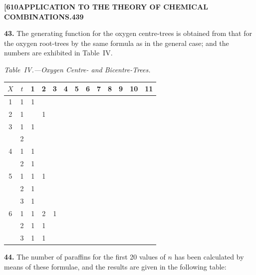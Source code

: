 \documentclass[11pt,a4paper]{article}
\begin{document}
{\newpage
\noindent\textbf{[610}\hspace{\fill}\textbf{APPLICATION TO THE THEORY OF CHEMICAL COMBINATIONS.}\hspace{\fill}\textbf{439}

\noindent\textbf{43.}
The generating function for the oxygen centre-trees is obtained from that for the oxygen root-trees by the same formula as in the general case; and the numbers are exhibited in Table~IV.

\medskip
\noindent\textit{Table~IV.---Oxygen Centre- and Bicentre-Trees.}
\begin{center}
\small
\begin{longtable}{|c|c|c|c|c|c|c|c|c|c|c|c|c|}
\hline
$X$ & $t$ & 1 & 2 & 3 & 4 & 5 & 6 & 7 & 8 & 9 & 10 & 11 \\
\hline
\endfirsthead
1 & 1 & 1 & & & & & & & & & & \\
\hline
2 & 1 & & 1 & & & & & & & & & \\
\hline
3 & 1 & 1 & & & & & & & & & & \\
  & 2 & & & & & & & & & & & \\
\hline
4 & 1 & 1 & & & & & & & & & & \\
  & 2 & 1 & & & & & & & & & & \\
\hline
5 & 1 & 1 & 1 & & & & & & & & & \\
  & 2 & 1 & & & & & & & & & & \\
  & 3 & 1 & & & & & & & & & & \\
\hline
6 & 1 & 1 & 2 & 1 & & & & & & & & \\
  & 2 & 1 & 1 & & & & & & & & & \\
  & 3 & 1 & 1 & & & & & & & & & \\
\hline
\end{longtable}
\end{center}

\medskip
\noindent\textbf{44.}
The number of paraffins for the first 20 values of $n$ has been calculated by means of these formulae, and the results are given in the following table:

}
\end{document}
